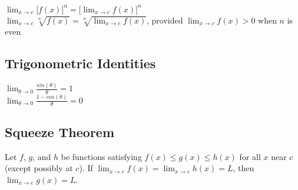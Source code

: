 \documentclass[a4paper]{article}
\begin{document}
$\displaystyle \lim_{x \rightarrow c} \big[ f(x) \big] ^ n = \big[ \lim_{x \rightarrow c} f(x) \big] ^ n$ \\

$\displaystyle \lim_{x \rightarrow c} \sqrt[n]{f(x)} = \sqrt[n]{\lim_{x \rightarrow c} f(x)}$, provided $\displaystyle \lim_{x \rightarrow c} f(x) > 0$ when $n$ is even

\subsection{Trigonometric Identities}

$\displaystyle \lim_{\theta \rightarrow 0} \frac{sin(\theta)}{\theta} = 1$ \\

$\displaystyle \lim_{\theta \rightarrow 0} \frac{1 - cos(\theta)}{\theta} = 0$

\subsection{Squeeze Theorem}

Let $f$, $g$, and $h$ be functions satisfying $f(x) \leq g(x) \leq h(x)$ for all $x$ near $c$ (except possibly at $c$). If $\displaystyle \lim_{x \rightarrow c} f(x) = \lim_{x \rightarrow c} h(x) = L$, then $\displaystyle \lim_{x \rightarrow c} g(x) = L$.
\end{document}
